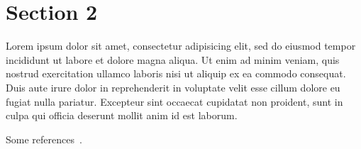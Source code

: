 \documentclass[a4paper, 12pt, twoside, dvipsnames]{article}
\begin{document}
\section{Section 2}
Lorem ipsum dolor sit amet, consectetur adipisicing elit, sed do eiusmod
tempor incididunt ut labore et dolore magna aliqua. Ut enim ad minim veniam,
quis nostrud exercitation ullamco laboris nisi ut aliquip ex ea commodo
consequat. Duis aute irure dolor in reprehenderit in voluptate velit esse
cillum dolore eu fugiat nulla pariatur. Excepteur sint occaecat cupidatat non
proident, sunt in culpa qui officia deserunt mollit anim id est laborum.

Some references~\cite{SMAD, Brown}.





\label{Lastpage}
\end{document}
